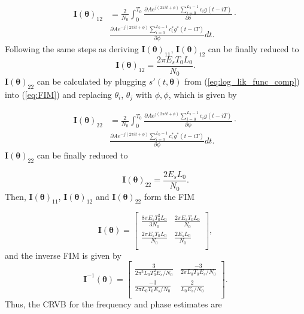 \begin{appendices}
\begin{equation}
\label{eq:FIM_delta_phi}
\begin{aligned}
\bm{I}(\bm{\theta})_{12}&=\frac{2}{N_{0}}\int_{0}^{T_{0}}\frac{\partial Ae^{j(2\pi\delta t+\phi)}\sum_{i=0}^{L_{0}-1}c_{i}g(t{-}iT)}{\partial \delta} \cdot \\
&\frac{\partial Ae^{-j(2\pi\delta t+\phi)}\sum_{i=0}^{L_{0}-1}c_{i}^{*}g^{*}(t{-}iT)}{\partial \phi}dt.
\end{aligned}
\end{equation}
Following the same steps as deriving $\bm{I}(\bm{\theta})_{11}$, $\bm{I}(\bm{\theta})_{12}$ can be finally reduced to
\begin{equation}
\label{eq:FIM_delta_phi_result}
\bm{I}(\bm{\theta})_{12}=\frac{2\pi E_{s}T_{0}L_{0}}{N_{0}}.
\end{equation}
$\bm{I}(\bm{\theta})_{22}$ can be calculated by plugging $s'(t,\bm{\theta})$ from (\ref{eq:log_lik_func_comp}) into (\ref{eq:FIM}) and replacing $\theta_{i}$, $\theta_{j}$ with $\phi,\phi$, which is given by

\begin{equation}
\label{eq:FIM_phi_phi}
\begin{aligned}
\bm{I}(\bm{\theta})_{22}&=\frac{2}{N_{0}}\int_{0}^{T_{0}}\frac{\partial Ae^{j(2\pi\delta t+\phi)}\sum_{i=0}^{L_{0}-1}c_{i}g(t{-}iT)}{\partial \phi} \cdot \\
&\frac{\partial Ae^{-j(2\pi\delta t+\phi)}\sum_{i=0}^{L_{0}-1}c_{i}^{*}g^{*}(t{-}iT)}{\partial \phi}dt.
\end{aligned}
\end{equation}
$\bm{I}(\bm{\theta})_{22}$ can be finally reduced to

\begin{equation}
\label{eq:FIM_phi_phi_result}
\bm{I}(\bm{\theta})_{22}=\frac{2E_{s}L_{0}}{N_{0}}.
\end{equation}
Then, $\bm{I}(\bm{\theta})_{11}$, $\bm{I}(\bm{\theta})_{12}$ and 
$\bm{I}(\bm{\theta})_{22}$ form the FIM

\begin{equation}
\label{eq:FIM_result}
\bm{I}(\bm{\theta})=
\begin{bmatrix}
\frac{8\pi E_{s}T_{0}^2L_{0}}{3N_{0}} & \frac{2\pi E_{s}T_{0}L_{0}}{N_{0}} \\
\frac{2\pi E_{s}T_{0}L_{0}}{N_{0}} & \frac{2E_{s}L_{0}}{N_{0}} \\
\end{bmatrix},
\end{equation}
and the inverse FIM is given by
\begin{equation}
\label{eq:inverse_FIM_result}
\bm{I}^{-1}(\bm{\theta})=
\begin{bmatrix}
\frac{3}{2\pi^{2}L_{0}T_{0}^2E_{s}/N_{0}} & \frac{-3}{2\pi L_{0}T_{0}E_{s}/N_{0}} \\
\frac{-3}{2\pi L_{0}T_{0}E_{s}/N_{0}} & \frac{2}{L_{0}E_{s}/N_{0}} \\
\end{bmatrix}.
\end{equation}
Thus, the CRVB for the frequency and phase estimates are


\end{appendices}
